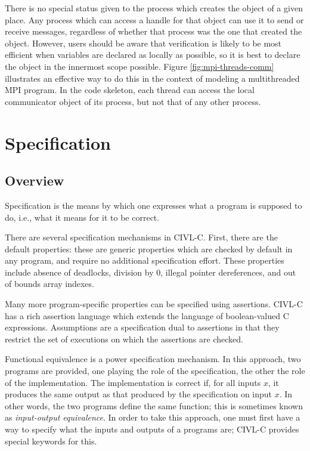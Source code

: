 There is no special status given to the process which creates the
\ccomm{} object of a given place.  Any process which can access a
handle for that \ccomm{} object can use it to send or receive
messages, regardless of whether that process was the one that created
the \ccomm{} object.  However, users should be aware that verification
is likely to be most efficient when variables are declared as locally
as possible, so it is best to declare the \ccomm{} object in the
innermost scope possible.  Figure \ref{fig:mpi-threads-comm}
illustrates an effective way to do this in the context of modeling a
multithreaded MPI program.  In the code skeleton, each thread can
access the local communicator object of its process, but not that of
any other process.

\chapter{Specification}

\section{Overview}

Specification is the means by which one expresses what a program is
supposed to do, i.e., what it means for it to be correct.

There are several specification mechanisms in CIVL-C. First, there are
the default properties: these are generic properties which are checked
by default in any program, and require no additional specification
effort. These properties include absence of deadlocks, division by 0,
illegal pointer dereferences, and out of bounds array indexes.

Many more program-specific properties can be specified using
assertions. CIVL-C has a rich assertion language which extends the
language of boolean-valued C expressions. Assumptions are a
specification dual to assertions in that they restrict the set
of executions on which the assertions are checked.

Functional equivalence is a power specification mechanism. In this
approach, two programs are provided, one playing the role of the
specification, the other the role of the implementation. The
implementation is correct if, for all inputs $x$, it produces the same
output as that produced by the specification on input $x$. In other
words, the two programs define the same function; this is sometimes
known as \emph{input-output equivalence}. In order to take this
approach, one must first have a way to specify what the inputs and
outputs of a programs are; CIVL-C provides special keywords for this.

